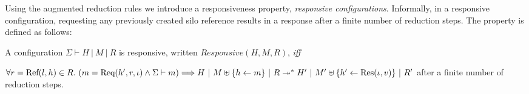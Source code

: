 Using the augmented reduction rules we introduce a responsiveness
property, {\em responsive configurations}. Informally, in a responsive
configuration, requesting any previously created silo reference
results in a response after a finite number of reduction steps. The
property is defined as follows:

\begin{defn}\label{def:resp-config}
  A configuration $\Sigma \vdash H~|~M~|~R$ is responsive, written
  $\mathit{Responsive}(H, M, R)$, {\em iff}

  $\forall r = {\textrm{Ref}(l, h)} \in R.~(m = {\textrm{Req}(h', r, \iota)} \land \Sigma \vdash m) \Longrightarrow H ~|~ M \uplus \{h \leftarrow m\} ~|~ R \twoheadrightarrow^* H' ~|~ M' \uplus \{h' \leftarrow {\textrm{Res}(\iota, v)}\} ~|~ R'$ after a finite number of reduction steps.
\end{defn}
